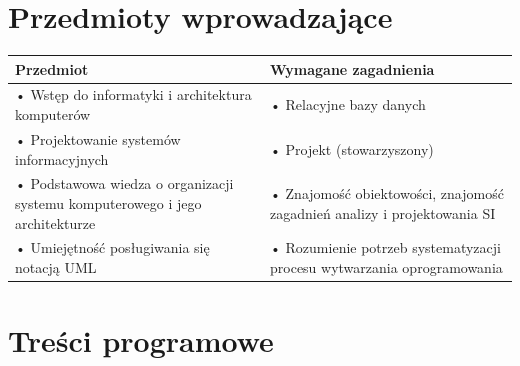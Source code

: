 \documentclass[12pt, a4paper]{article}
\begin{document}
\section{Przedmioty wprowadzające}

\begin{tabularx}{\textwidth}{lX}
  \hline
  \textbf{Przedmiot} & \textbf{Wymagane zagadnienia} \\
  \hline
  • Wstęp do informatyki i architektura komputerów & • Relacyjne bazy danych \\
  • Projektowanie systemów informacyjnych & • Projekt (stowarzyszony) \\
  • Podstawowa wiedza o organizacji systemu komputerowego i jego architekturze & • Znajomość obiektowości, znajomość zagadnień analizy i projektowania SI \\
  • Umiejętność posługiwania się notacją UML & • Rozumienie potrzeb systematyzacji procesu wytwarzania oprogramowania \\
  \hline
\end{tabularx}

\section{Treści programowe}
\end{document}
